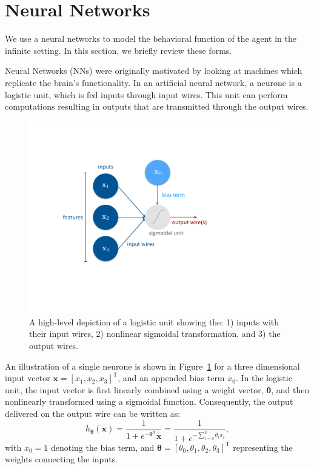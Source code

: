 \section{Neural Networks}
We use a neural networks to model the behavioral function of the agent in the infinite setting. In this section, we briefly review these forms. 


Neural Networks (NNs) were originally motivated by looking at machines which replicate the brain's functionality. In an artificial neural network, a neurone is a logistic unit, which is fed inputs through input wires. This unit can perform computations resulting in outputs that are transmitted through the output wires. 

\begin{figure}[h!]
\label{Fig:FigOne}
\centering 
\includegraphics[trim = 10em 10em 10em 10em, clip, width= .7\textwidth]{OneUnit}
\caption{A high-level depiction of a logistic unit showing the: 1) inputs with their input wires, 2) nonlinear sigmoidal transformation, and 3) the output wires. }
\end{figure}

An illustration of a single neurone is shown in Figure~\ref{Fig:FigOne} for a three dimensional input vector $\bm{x} = [x_{1}, x_{2}, x_{3}]^{\mathsf{T}}$, and an appended bias term $x_{0}$. In the logistic unit, the input vector is first linearly combined using a weight vector, $\bm{\theta}$, and then nonlinearly transformed using a sigmoidal function. Consequently, the output delivered on the output wire can be written as:
\begin{equation*}
h_{\bm{\theta}} (\bm{x}) = \frac{1}{1 + e^{-\bm{\theta}^{\mathsf{T}}}\bm{x}} = \frac{1}{1 + e^{-\sum_{i=0}^{3} \theta_{i}x_{i}}},
\end{equation*}
with $x_{0} =1$ denoting the bias term, and $\bm{\theta} = [\theta_{0}, \theta_{1}, \theta_{2}, \theta_{3}]^{\mathsf{T}}$ representing the weights connecting the inputs. 

